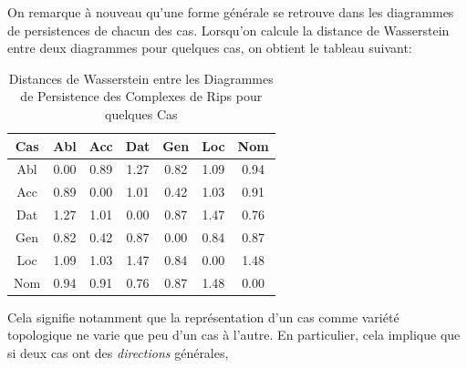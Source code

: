 \documentclass{cours}
\begin{document}
    On remarque à nouveau qu'une forme générale se retrouve dans les diagrammes de persistences de chacun des cas.
    Lorsqu'on calcule la distance de Wasserstein entre deux diagrammes pour quelques cas, on obtient le tableau suivant:
    \begin{table}[H]
        \centering
        \begin{tabular}{c|cccccc}
            \toprule
            Cas & Abl & Acc & Dat & Gen & Loc & Nom\\
            \midrule
            Abl & 0.00 & 0.89 & 1.27 & 0.82 & 1.09 & 0.94\\
            Acc & 0.89 & 0.00 & 1.01 & 0.42 & 1.03 & 0.91\\
            Dat & 1.27 & 1.01 & 0.00 & 0.87 & 1.47 & 0.76\\
            Gen & 0.82 & 0.42 & 0.87 & 0.00 & 0.84 & 0.87\\
            Loc & 1.09 & 1.03 & 1.47 & 0.84 & 0.00 & 1.48\\
            Nom & 0.94 & 0.91 & 0.76 & 0.87 & 1.48 & 0.00\\
            \bottomrule
        \end{tabular}
        \caption{Distances de Wasserstein entre les Diagrammes de Persistence des Complexes de Rips pour quelques Cas}
    \end{table}

    Cela signifie notamment que la représentation d'un cas comme variété topologique ne varie que peu d'un cas à l'autre.
    En particulier, cela implique que si deux cas ont des \emph{directions} générales,
\end{document}
